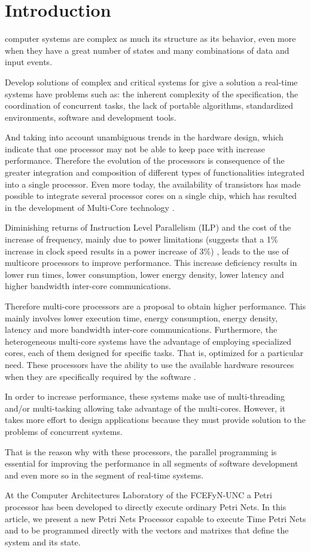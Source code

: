 \section{Introduction}
	 computer systems are complex as much its structure as its behavior, even 
	more when they have a great number of states and many combinations of data and input events.

Develop solutions of complex and critical systems for give a solution a real-time systems have 
 problems such as: the inherent complexity of the specification, the coordination of concurrent 
 tasks, the lack of portable algorithms, standardized environments, software and development tools.

And taking into account unambiguous trends in the hardware design, which indicate that one processor
 may not be able to keep pace with increase performance. Therefore the evolution of the processors 
 is consequence of the greater integration and composition of different types of functionalities 
 integrated into a single processor. Even more today, the availability of transistors has made 
 possible to integrate several processor cores on a single chip, which has resulted in the 
 development of Multi-Core technology \cite{hennessypatterson}.
 
Diminishing returns of Instruction Level Parallelism (ILP) and the cost of the increase of frequency,
 mainly due to power limitations (suggests that a 1\% increase in clock speed results in a power 
 increase of 3\%) \cite{domeika}, leads to the use of multicore processors to improve performance. 
 This increase deficiency results in lower run times, lower consumption, lower energy density, lower
 latency and higher bandwidth inter-core communications.
    
Therefore multi-core processors are a proposal to obtain higher performance. This mainly involves 
 lower execution time, energy consumption, energy density, latency and more bandwidth inter-core 
 communications. Furthermore, the heterogeneous multi-core systems have the advantage of employing 
 specialized cores, each of them designed for specific tasks. That is, optimized for a particular 
 need. These processors have the ability to use the available hardware resources when they are 
 specifically required by the software \cite{sriram}.

In order to increase performance, these systems make use of multi-threading and/or multi-tasking 
 allowing take advantage of the multi-cores. However, it takes more effort to design applications 
 because they must provide solution to the problems of concurrent systems.

That is the reason why with these processors, the parallel programming is essential for improving 
 the performance in all segments of software development and even more so in the segment of real-time
 systems.
 
At the Computer Architectures Laboratory of the FCEFyN-UNC a Petri processor has been developed to 
 directly execute ordinary Petri Nets. In this article, we present a new Petri Nets Processor capable
 to execute Time Petri Nets and to be programmed directly with the vectors and matrixes that define 
 the system and its state.
	


